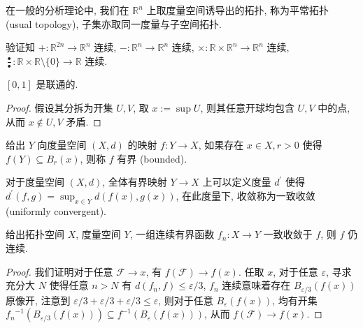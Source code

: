 \begin{definition}[平常拓扑]
    在一般的分析理论中, 我们在 \(\mathbb{R}^n\) 上取度量空间诱导出的拓扑, 称为平常拓扑 (usual topology), 子集亦取同一度量与子空间拓扑.
\end{definition}

\begin{corollary}
    验证知 \(+ : \mathbb{R}^{2n} \to \mathbb{R}^n\) 连续, \(- : \mathbb{R}^n \to \mathbb{R}^n\) 连续, \(\times : \mathbb{R} \times \mathbb{R}^n \to \mathbb{R}^n\) 连续,
    \(\frac{\bullet}{\bullet} : \mathbb{R} \times \mathbb{R} \setminus \{0\} \to \mathbb{R}\) 连续.
\end{corollary}

\begin{lemma}
    \([0,1]\) 是联通的.

    \begin{proof}
        假设其分拆为开集 \(U,V\), 取 \(x := \sup U\), 则其任意开球均包含 \(U,V\) 中的点, 从而 \(x \notin U,V\) 矛盾.
    \end{proof}
\end{lemma}

\begin{definition}[有界]
    给出 \(Y\) 向度量空间 \((X,d)\) 的映射 \(f : Y \to X\), 如果存在 \(x \in X,r > 0\) 使得 \(f(Y) \subseteq B_r (x)\), 则称 \(f\) 有界 (bounded).
\end{definition}

\begin{definition}
    对于度量空间 \((X,d)\), 全体有界映射 \(Y \to X\) 上可以定义度量 \(d^\prime\) 使得 \(d^\prime (f,g) = \sup_{x \in Y} d(f(x),g(x))\),
    在此度量下, 收敛称为一致收敛 (uniformly convergent).
\end{definition}

\begin{theorem}
    \label {theorem:weierstrass uniform convergence}
    给出拓扑空间 \(X\), 度量空间 \(Y\), 一组连续有界函数 \(f_n : X \to Y\) 一致收敛于 \(f\), 则 \(f\) 仍连续.

    \begin{proof}
        我们证明对于任意 \(\mathcal{F} \to x\), 有 \(f (\mathcal{F}) \to f(x)\).
        任取 \(x\), 对于任意 \(\varepsilon\), 寻求充分大 \(N\) 使得任意 \(n>N\) 有 \(d (f_n,f) \le \varepsilon/3\),
        \(f_n\) 连续意味着存在 \(B_{\varepsilon/3} (f(x))\) 原像开, 注意到 \(\varepsilon/3+\varepsilon/3+\varepsilon/3 \le \varepsilon\), 则对于任意 \(B_{\varepsilon} (f(x))\),
        均有开集 \({f_n}^{-1} (B_{\varepsilon/3} (f(x))) \subseteq f^{-1} (B_{\varepsilon} (f(x)))\), 
        从而 \(f (\mathcal{F}) \to f(x)\).
    \end{proof}
\end{theorem}

